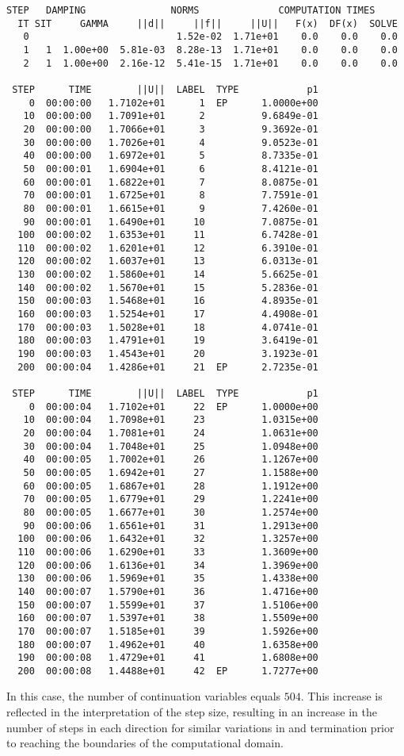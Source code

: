 \begin{lstlisting}[language=coco-highlight]
    STEP   DAMPING               NORMS              COMPUTATION TIMES
  IT SIT     GAMMA     ||d||     ||f||     ||U||   F(x)  DF(x)  SOLVE
   0                          1.52e-02  1.71e+01    0.0    0.0    0.0
   1   1  1.00e+00  5.81e-03  8.28e-13  1.71e+01    0.0    0.0    0.0
   2   1  1.00e+00  2.16e-12  5.41e-15  1.71e+01    0.0    0.0    0.0

 STEP      TIME        ||U||  LABEL  TYPE            p1
    0  00:00:00   1.7102e+01      1  EP      1.0000e+00
   10  00:00:00   1.7091e+01      2          9.6849e-01
   20  00:00:00   1.7066e+01      3          9.3692e-01
   30  00:00:00   1.7026e+01      4          9.0523e-01
   40  00:00:00   1.6972e+01      5          8.7335e-01
   50  00:00:01   1.6904e+01      6          8.4121e-01
   60  00:00:01   1.6822e+01      7          8.0875e-01
   70  00:00:01   1.6725e+01      8          7.7591e-01
   80  00:00:01   1.6615e+01      9          7.4260e-01
   90  00:00:01   1.6490e+01     10          7.0875e-01
  100  00:00:02   1.6353e+01     11          6.7428e-01
  110  00:00:02   1.6201e+01     12          6.3910e-01
  120  00:00:02   1.6037e+01     13          6.0313e-01
  130  00:00:02   1.5860e+01     14          5.6625e-01
  140  00:00:02   1.5670e+01     15          5.2836e-01
  150  00:00:03   1.5468e+01     16          4.8935e-01
  160  00:00:03   1.5254e+01     17          4.4908e-01
  170  00:00:03   1.5028e+01     18          4.0741e-01
  180  00:00:03   1.4791e+01     19          3.6419e-01
  190  00:00:03   1.4543e+01     20          3.1923e-01
  200  00:00:04   1.4286e+01     21  EP      2.7235e-01

 STEP      TIME        ||U||  LABEL  TYPE            p1
    0  00:00:04   1.7102e+01     22  EP      1.0000e+00
   10  00:00:04   1.7098e+01     23          1.0315e+00
   20  00:00:04   1.7081e+01     24          1.0631e+00
   30  00:00:04   1.7048e+01     25          1.0948e+00
   40  00:00:05   1.7002e+01     26          1.1267e+00
   50  00:00:05   1.6942e+01     27          1.1588e+00
   60  00:00:05   1.6867e+01     28          1.1912e+00
   70  00:00:05   1.6779e+01     29          1.2241e+00
   80  00:00:05   1.6677e+01     30          1.2574e+00
   90  00:00:06   1.6561e+01     31          1.2913e+00
  100  00:00:06   1.6432e+01     32          1.3257e+00
  110  00:00:06   1.6290e+01     33          1.3609e+00
  120  00:00:06   1.6136e+01     34          1.3969e+00
  130  00:00:06   1.5969e+01     35          1.4338e+00
  140  00:00:07   1.5790e+01     36          1.4716e+00
  150  00:00:07   1.5599e+01     37          1.5106e+00
  160  00:00:07   1.5397e+01     38          1.5509e+00
  170  00:00:07   1.5185e+01     39          1.5926e+00
  180  00:00:07   1.4962e+01     40          1.6358e+00
  190  00:00:08   1.4729e+01     41          1.6808e+00
  200  00:00:08   1.4488e+01     42  EP      1.7277e+00
\end{lstlisting}
In this case, the number of continuation variables equals $504$. This increase is reflected in the interpretation of the step size, resulting in an increase in the number of steps in each direction for similar variations in  and termination prior to reaching the boundaries of the computational domain.

